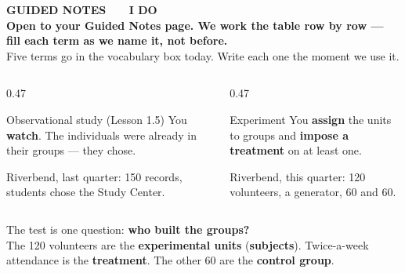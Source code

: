 \documentclass[aspectratio=169, 11pt]{beamer}
\newcommand{\redink}[1]{{\color{redacc}\bfseries #1}}
\begin{document}
{
\begin{frame}[plain]
  \vspace{1.8cm}\hspace{0.8cm}%
  \begin{minipage}{0.86\textwidth}
    {\color{goldacc}\bfseries\small GUIDED NOTES \ \textbullet\ \ I DO}\\[0.7cm]
    {\color{white}\bfseries\Large Open to your Guided Notes page. We work the table row by
    row --- fill each term as we name it, not before.}\\[0.9cm]
    {\color{frostmid}\small Five terms go in the vocabulary box today. Write each one the
    moment we use it.}
  \end{minipage}
\end{frame}
}

\begin{frame}[t, plain]
  \vspace{4pt}
  \begin{columns}[t]
    \begin{column}{0.47\textwidth}
      \begin{block}{Observational study (Lesson 1.5)}
        You \textbf{watch}. The individuals were already in their groups --- they chose.
      \end{block}
      \vspace{4pt}
      {\small Riverbend, last quarter: 150 records, students chose the Study Center.}
    \end{column}
    \begin{column}{0.47\textwidth}
      \begin{block}{Experiment}
        You \textbf{assign} the units to groups and \textbf{impose a treatment} on at least one.
      \end{block}
      \vspace{4pt}
      {\small Riverbend, this quarter: 120 volunteers, a generator, 60 and 60.}
    \end{column}
  \end{columns}
  \vspace{10pt}
  \begin{center}
    {\large The test is one question: \redink{who built the groups?}}\\[6pt]
    {\small\color{slate} The 120 volunteers are the \textbf{experimental units}
    (\textbf{subjects}). Twice-a-week attendance is the \textbf{treatment}. The other 60 are
    the \textbf{control group}.}
  \end{center}
\end{frame}
\end{document}

